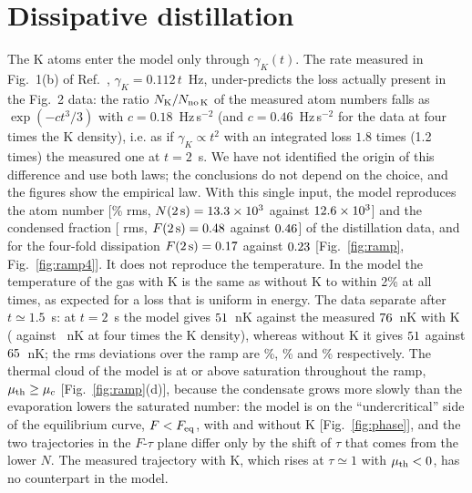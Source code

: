 \section{Dissipative distillation}
\label{sec:diss}
The K atoms enter the model only through $\gamma_K(t)$. The rate measured in
Fig.~1(b) of Ref.~\cite{MelladoMunoz2020}, $\gamma_K=0.112\,t$~Hz, under-predicts
the loss actually present in the Fig.~2 data: the ratio $N_{\rm K}/N_{\rm no\,K}$
of the measured atom numbers falls as $\exp(-ct^3/3)$ with $c=0.18$~Hz\,s$^{-2}$
(and $c=0.46$~Hz\,s$^{-2}$ for the data at four times the K density), i.e. as
if $\gamma_K\propto t^2$ with an integrated loss $1.8$ times (1.2 times) the
measured one at $t=2$~s. We have not identified the origin of this difference
and use both laws; the conclusions do not depend on the choice, and the
figures show the empirical law. With this single input, the model reproduces
the atom number [\dsNrms\% rms, $N(2\,{\rm s})=13.3\times10^3$ against
$12.6\times10^3$] and the condensed fraction [\dsFrms{} rms,
$F(2\,{\rm s})=0.48$ against $0.46$] of the distillation data, and for
the four-fold dissipation $F(2\,{\rm s})=0.17$ against $0.23$
[Fig.~\ref{fig:ramp}, Fig.~\ref{fig:ramp4}]. It does not reproduce the
temperature. In the model the temperature of the gas with K is the same as
without K to within 2\% at all times, as expected for a loss that is uniform
in energy. The data separate after $t\simeq1.5$~s: at $t=2$~s the model gives
$51$~nK against the measured $76$~nK with K (\dqTmod{} against
\dqTdat~nK at four times the K density), whereas without K it gives
$51$ against $65$~nK; the rms deviations over the ramp are
\dsTrms\%, \dqTrms\% and \ndTrms\% respectively. The thermal cloud of the model
is at or above saturation throughout the ramp, $\mu_{\rm th}\ge\mu_c$
[Fig.~\ref{fig:ramp}(d)], because the condensate grows more slowly than the
evaporation lowers the saturated number: the model is on the ``undercritical''
side of the equilibrium curve, $F<F_{\rm eq}$, with and without K
[Fig.~\ref{fig:phase}], and the two trajectories in the $F$-$\tau$ plane
differ only by the shift of $\tau$ that comes from the lower $N$. The
measured trajectory with K, which rises at $\tau\simeq1$ with
$\mu_{\rm th}<0$, has no counterpart in the model.

